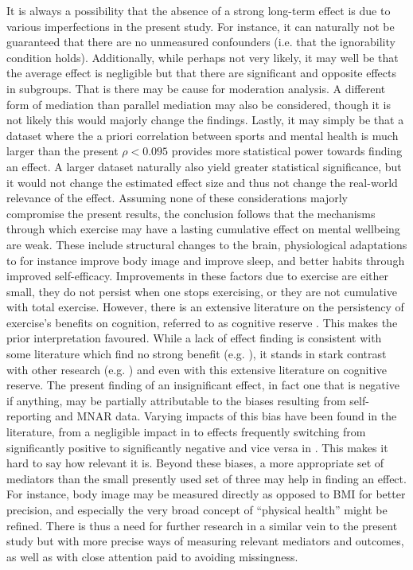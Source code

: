 It is always a possibility that the absence of a strong long-term effect is due to various imperfections
in the present study. For instance, it can naturally not be guaranteed that there are no unmeasured confounders
(i.e. that the ignorability condition holds). Additionally, while perhaps not very likely, it may well be that
the average effect is negligible but that there are significant and opposite effects in subgroups.
That is there may be cause for moderation analysis.
A different form of mediation than parallel mediation may also be considered,
though it is not likely this would majorly change the findings.
Lastly, it may simply be that a dataset where the a priori correlation
between sports and mental health is much larger than the present $\rho < 0.095$ provides more statistical power
towards finding an effect.
A larger dataset naturally also yield greater statistical significance, but it would not change the estimated effect size
and thus not change the real-world relevance of the effect.
Assuming none of these considerations majorly compromise the present results, the conclusion follows that
the mechanisms through which exercise may have a lasting cumulative effect on mental wellbeing are weak.
These include structural changes to the brain, physiological adaptations to for instance
improve body image and improve sleep, and better habits through improved self-efficacy.
Improvements in these factors due to exercise are either small, they do not persist when one stops exercising,
or they are not cumulative with total exercise.
However, there is an extensive literature on the persistency of exercise's benefits on cognition, referred to as
cognitive reserve \cite{cheng2016cognitive,stern2009cognitive}. This makes the prior interpretation favoured.
While a lack of effect finding is consistent with some literature which find no strong benefit (e.g. ),
it stands in stark contrast with other research (e.g. ) and even with this extensive literature
on cognitive reserve.
The present finding of an insignificant effect, in fact one that is negative if anything, may be partially attributable
to the biases resulting from self-reporting and MNAR data.
Varying impacts of this bias have been found in the literature, from a negligible impact in 
to effects frequently switching from significantly positive to significantly negative and vice versa in .
This makes it hard to say how relevant it is.
Beyond these biases, a more appropriate set of mediators than the small presently used set of three may help
in finding an effect. For instance, body image may be measured directly as opposed to BMI for better precision,
and especially the very broad concept of ``physical health'' might be refined.
There is thus a need for further research in a similar vein to the present study but with more precise ways of measuring
relevant mediators and outcomes, as well as with close attention paid to avoiding missingness.

